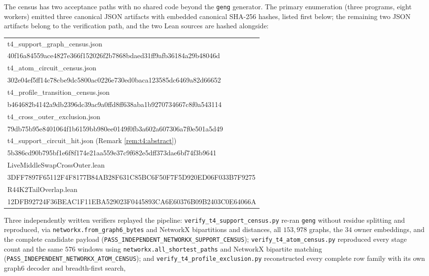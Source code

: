 The census has two acceptance paths with no shared code beyond the
\texttt{geng} generator. The primary
enumeration (three programs, eight workers) emitted three canonical
JSON artifacts with embedded canonical SHA-256 hashes, listed first
below; the remaining two JSON artifacts belong to the verification
path, and the two Lean sources are hashed alongside:
\begin{center}
\small\ttfamily
\begin{tabular}{l}
t4\_support\_graph\_census.json\\
\quad 40f16a84559ace4827e366f152026f2b7868bdaed31ff9afb36184a29b48046d\\
t4\_atom\_circuit\_census.json\\
\quad 302e04ef5ff14c78cbe9dc5800ac0226e730ed0baca123585dc6469a82d66652\\
t4\_profile\_transition\_census.json\\
\quad b464682b4142a9db2396dc39ac9a0ffd8ff638aba1b9270734667c8f0a543114\\
t4\_cross\_outer\_exclusion.json\\
\quad 79db75b95e8401064f1b6159bb980ee0149f0fb3a602a607306a7f0e501a5d49\\
t4\_support\_circuit\_hit.json (Remark \ref{rem:t4:abstract})\\
\quad 5b386cd90b795bf1e6f8f174e21aa559e37c9f682e5dff373dae6bf74f3b9641\\
LiveMiddleSwapCrossOuter.lean\\
\quad 3DFF7897F65112F4F8177B84AB28F631C85BC6F50F7F5D920ED06F033B7F9275\\
R44K2TailOverlap.lean\\
\quad 12DFB92724F36BEAC1F11EBA529023F0445893CA6E60376B09B2403C0E64066A
\end{tabular}
\end{center}
Three independently written verifiers replayed the pipeline:
\texttt{verify\_t4\_support\_census.py} re-ran \texttt{geng} without
residue splitting and reproduced, via
\texttt{networkx.from\_graph6\_bytes} and NetworkX bipartitions and
distances, all \(153{,}978\) graphs, the \(34\) owner embeddings, and
the complete candidate payload
(\texttt{PASS\_INDEPENDENT\_NETWORKX\_SUPPORT\_CENSUS});
\texttt{verify\_t4\_atom\_census.py} reproduced every stage count and
the same \(576\) windows using \texttt{networkx.all\_shortest\_paths}
and NetworkX bipartite matching
(\texttt{PASS\_INDEPENDENT\_NETWORKX\_ATOM\_CENSUS}); and
\texttt{verify\_t4\_profile\_exclusion.py} reconstructed every complete
row family with its own graph6 decoder and breadth-first search,
